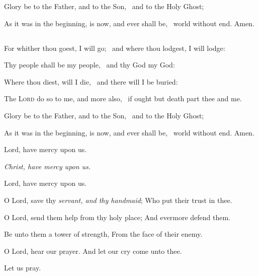 Glory be to the Father, and to the Son, \star\  and to the Holy Ghost;

As it was in the beginning, is now, and ever shall be, \star\  world without end. Amen.

\medskip
\centerline{}

\subsection[{The Song of Ruth}]{}

For whither thou goest, I will go; \star\ and where thou lodgest, I will lodge:

Thy people shall be my people, \star\ and thy God my God:

Where thou diest, will I die, \star\ and there will I be buried:

The {\scshape Lord} do so to me, and more also,  \star\  if ought but death part thee and me.

Glory be to the Father, and to the Son, \star\  and to the Holy Ghost;

As it was in the beginning, is now, and ever shall be, \star\  world without end. Amen.

\bigskip

\centerline{Lord, have mercy upon us.}
\centerline{\emph{Christ, have mercy upon us.}}
\centerline{Lord, have mercy upon us.}

\medskip

\ourFather

\smallskip

\V O Lord, save thy \emph{servant, and thy handmaid}; \R Who put their trust in thee.

\V O Lord, send them help from thy holy place; \R And evermore defend them.

\V Be unto them a tower of strength, \R From the face of their enemy.

\V O Lord, hear our prayer. \R And let our cry come unto thee.

\centerline{Let us pray.}


